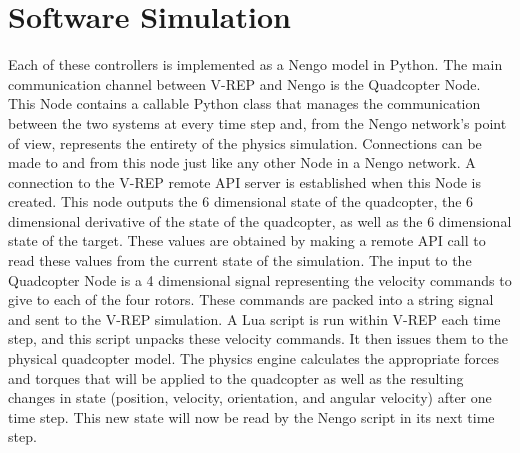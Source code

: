 \documentclass[letterpaper,12pt,titlepage,oneside,final]{book}
\begin{document}

\section{Software Simulation}


Each of these controllers is implemented as a Nengo model in Python. 
The main communication channel between V-REP and Nengo is the Quadcopter Node. 
This Node contains a callable Python class that manages the communication between the two systems at every time step and, from the Nengo network's point of view, represents the entirety of the physics simulation. 
Connections can be made to and from this node just like any other Node in a Nengo network. 
A connection to the V-REP remote API server is established when this Node is created. 
This node outputs the 6 dimensional state of the quadcopter, the 6 dimensional derivative of the state of the quadcopter, as well as the 6 dimensional state of the target. 
These values are obtained by making a remote API call to read these values from the current state of the simulation. The input to the Quadcopter Node is a 4 dimensional signal representing the velocity commands to give to each of the four rotors. 
These commands are packed into a string signal and sent to the V-REP simulation. 
A Lua script is run within V-REP each time step, and this script unpacks these velocity commands. 
It then issues them to the physical quadcopter model. The physics engine calculates the appropriate forces and torques that will be applied to the quadcopter as well as the resulting changes in state (position, velocity, orientation, and angular velocity) after one time step. 
This new state will now be read by the Nengo script in its next time step.
\end{document}
